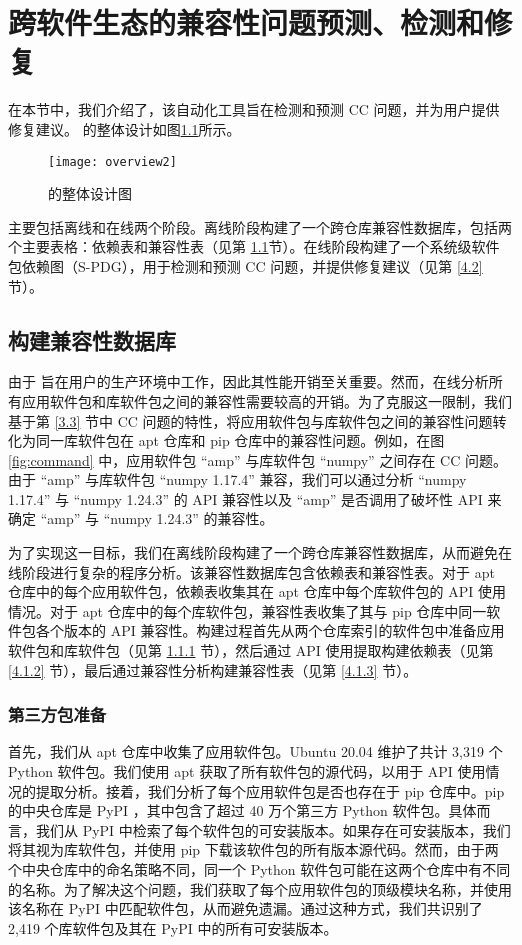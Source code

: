 \chapter{跨软件生态的兼容性问题预测、检测和修复}
在本节中，我们介绍了\tool{}，该自动化工具旨在检测和预测 CC 问题，并为用户提供修复建议。
\tool{}的整体设计如图\ref{fig:overview}所示。
\begin{figure}[htbp] %
	\centering
	\texttt{[image: overview2]}
	\caption{\tool{}的整体设计图}
	\label{fig:overview}
\end{figure}
\tool{}主要包括离线和在线两个阶段。离线阶段构建了一个跨仓库兼容性数据库，包括两个主要表格：依赖表和兼容性表（见第 \ref{4.1}节）。在线阶段构建了一个系统级软件包依赖图（S-PDG），用于检测和预测 CC 问题，并提供修复建议（见第 \ref{4.2} 节）。

\section{构建兼容性数据库}\label{4.1}
由于 \tool{} 旨在用户的生产环境中工作，因此其性能开销至关重要。然而，在线分析所有应用软件包和库软件包之间的兼容性需要较高的开销。为了克服这一限制，我们基于第 \ref{3.3} 节中 CC 问题的特性，将应用软件包与库软件包之间的兼容性问题转化为同一库软件包在 apt 仓库和 pip 仓库中的兼容性问题。例如，在图 \ref{fig:command} 中，应用软件包 “amp” 与库软件包 “numpy” 之间存在 CC 问题。由于 “amp” 与库软件包 “numpy 1.17.4” 兼容，我们可以通过分析 “numpy 1.17.4” 与 “numpy 1.24.3” 的 API 兼容性以及 “amp” 是否调用了破坏性 API 来确定 “amp” 与 “numpy 1.24.3” 的兼容性。

为了实现这一目标，我们在离线阶段构建了一个跨仓库兼容性数据库，从而避免在线阶段进行复杂的程序分析。该兼容性数据库包含依赖表和兼容性表。对于 apt 仓库中的每个应用软件包，依赖表收集其在 apt 仓库中每个库软件包的 API 使用情况。对于 apt 仓库中的每个库软件包，兼容性表收集了其与 pip 仓库中同一软件包各个版本的 API 兼容性。构建过程首先从两个仓库索引的软件包中准备应用软件包和库软件包（见第 \ref{4.1.1} 节），然后通过 API 使用提取构建依赖表（见第 \ref{4.1.2} 节），最后通过兼容性分析构建兼容性表（见第 \ref{4.1.3} 节）。

\subsection{第三方包准备}\label{4.1.1}
首先，我们从 apt 仓库中收集了应用软件包。Ubuntu 20.04 维护了共计 3,319 个 Python 软件包。我们使用 apt 获取了所有软件包的源代码，以用于 API 使用情况的提取分析。接着，我们分析了每个应用软件包是否也存在于 pip 仓库中。pip 的中央仓库是 PyPI ，其中包含了超过 40 万个第三方 Python 软件包。具体而言，我们从 PyPI 中检索了每个软件包的可安装版本。如果存在可安装版本，我们将其视为库软件包，并使用 pip 下载该软件包的所有版本源代码。然而，由于两个中央仓库中的命名策略不同，同一个 Python 软件包可能在这两个仓库中有不同的名称。为了解决这个问题，我们获取了每个应用软件包的顶级模块名称，并使用该名称在 PyPI 中匹配软件包，从而避免遗漏。通过这种方式，我们共识别了 2,419 个库软件包及其在 PyPI 中的所有可安装版本。

